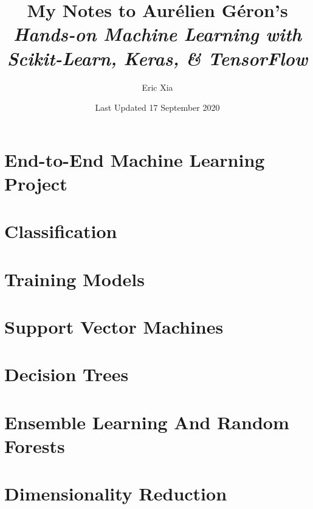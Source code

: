 \documentclass{article}
\title{My Notes to Aurélien Géron's \textit{Hands-on Machine Learning with Scikit-Learn, Keras, \& TensorFlow}}
\author{Eric Xia}
\date{Last Updated 17 September 2020}
\begin{document}
    \maketitle
    \tableofcontents
    \pagebreak


    


%    
%    
%    
%    
%    
%    
%    
%    
%    
%    
%    
%    
%    
%    
%    
%    
%    
%    


    \section{End-to-End Machine Learning Project}
    \section{Classification}
    \section{Training Models}
    \section{Support Vector Machines}
    \section{Decision Trees}
    \section{Ensemble Learning And Random Forests}
    \section{Dimensionality Reduction}
\end{document}
